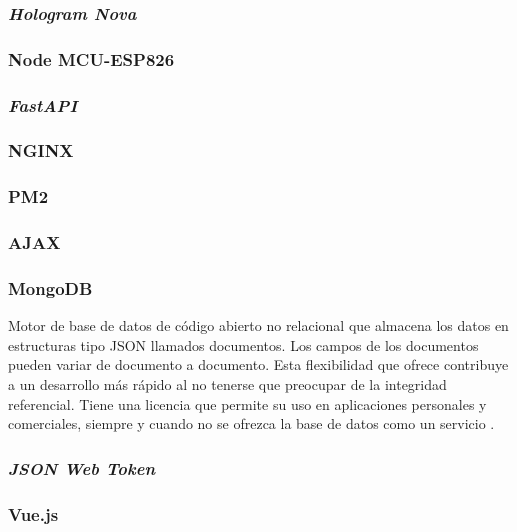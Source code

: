 \subsubsection{\textit{Hologram Nova}}
\subsubsection{Node MCU-ESP826}
\subsubsection{\textit{FastAPI}}
\subsubsection{NGINX}
\subsubsection{PM2}
\subsubsection{AJAX}
\subsubsection{MongoDB}
Motor de base de datos de código abierto no relacional que almacena los datos en estructuras tipo JSON llamados documentos. Los campos de los documentos pueden variar de documento a documento. Esta flexibilidad que ofrece contribuye a un desarrollo más rápido al no tenerse que preocupar de la integridad referencial. Tiene una licencia que permite su uso en aplicaciones personales y comerciales, siempre y cuando no se ofrezca la base de datos como un servicio \cite{what_is_mongo}.

\subsubsection{\textit{JSON Web Token}}


\subsubsection{Vue.js}








